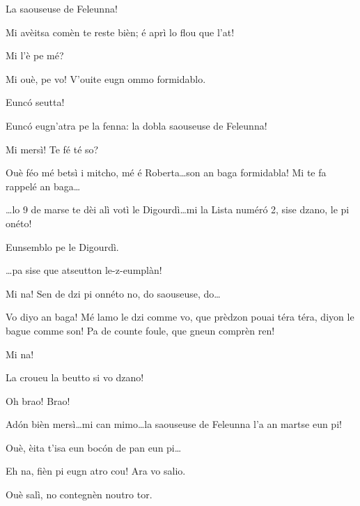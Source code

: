 \begin{drama}
\Cimaspeaks La saouseuse de Feleunna!

 
 Mi avèitsa comèn te reste bièn; é aprì lo flou que l'at!

\Jeanspeaks Mi l'è pe mé?

\Cimaspeaks Mi ouè, pe vo! V'ouite eugn ommo formidablo.


\Marcospeaks Eunc\'o seutta!

\Cimaspeaks Eunc\'o eugn'atra pe la fenna: la dobla saouseuse de Feleunna!

\Jeanspeaks Mi mersì! Te fé té so?

\Cimaspeaks Ouè féo mé betsì i mitcho, mé é Roberta\ldots son an baga formidabla! Mi te fa rappelé an baga\ldots


\Cimaspeaks \ldots lo 9 de marse te dèi alì votì le Digourdì\ldots mi la Lista num\'er\'o 2, sise dzano, le pi onéto!


\Jeanspeaks {} \og Eunsemblo pe le Digourdì\fg.

\Marcospeaks \ldots pa sise que atseutton le-z-eumplàn!

\Cimaspeaks Mi na! Sen de dzi pi onnéto no, do saouseuse, do\ldots

\Jeanspeaks  Vo diyo an baga! Mé lamo le dzi comme vo, que prèdzon pouai téra téra, diyon le bague comme son! Pa de counte foule, que gneun comprèn ren!

\Cimaspeaks Mi na! 

\Jeanspeaks La croueu la beutto si vo dzano!

\CimaMarcospeaks Oh brao! Brao!

\Cimaspeaks Ad\'on bièn mersì\ldots mi can mimo\ldots la saouseuse de Feleunna l'a an martse eun pi!

\Jeanspeaks Ouè, èita t'isa eun boc\'on de pan eun pi\ldots

\Cimaspeaks Eh na, fièn pi eugn atro cou! Ara vo salio.

\Marcospeaks Ouè  salì, no contegnèn noutro tor.



\end{drama}

